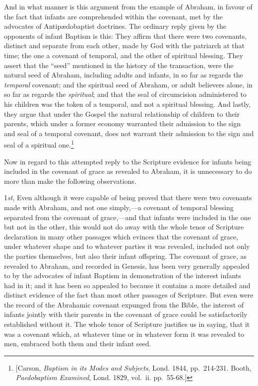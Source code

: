 \documentclass[english,]{book}
\begin{document}
And in what manner is this argument from the example of Abraham, in favour of the fact that infants are comprehended within the covenant, met by the advocates of Antipædobaptist doctrines. The ordinary reply given by the opponents of infant Baptism is this: They affirm that there were two covenants, distinct and separate from each other, made by God with the patriarch at that time; the one a covenant of temporal, and the other of spiritual blessing. They assert that the ``seed'' mentioned in the history of the transaction, were the natural seed of Abraham, including adults and infants, in so far as regards the \emph{temporal} covenant; and the spiritual seed of Abraham, or adult believers alone, in so far as regards the \emph{spiritual}; and that the seal of circumcision administered to his children was the token of a temporal, and not a spiritual blessing. And lastly, they argue that under the Gospel the natural relationship of children to their parents, which under a former economy warranted their admission to the sign and seal of a temporal covenant, does not warrant their admission to the sign and seal of a spiritual one.\footnote{{[}Carson, \emph{Baptism in its Modes and Subjects}, Lond. 1844, pp.~214-231. Booth, \emph{Paedobaptism Examined}, Lond. 1829, vol.~ii. pp.~55-68.{]}}

Now in regard to this attempted reply to the Scripture evidence for infants being included in the covenant of grace as revealed to Abraham, it is unnecessary to do more than make the following observations.

1\emph{st}, Even although it were capable of being proved that there were two covenants made with Abraham, and not one simply,---a covenant of temporal blessing separated from the covenant of grace,---and that infants were included in the one but not in the other, this would not do away with the whole tenor of Scripture declaration in many other passages which evinces that the covenant of grace, under whatever shape and to whatever parties it was revealed, included not only the parties themselves, but also their infant offspring. The covenant of grace, as revealed to Abraham, and recorded in Genesis, has been very generally appealed to by the advocates of infant Baptism in demonstration of the interest infants had in it; and it has been so appealed to because it contains a more detailed and distinct evidence of the fact than most other passages of Scripture. But even were the record of the Abrahamic covenant expunged from the Bible, the interest of infants jointly with their parents in the covenant of grace could be satisfactorily established without it. The whole tenor of Scripture justifies us in saying, that it was a covenant which, at whatever time or in whatever form it was revealed to men, embraced both them and their infant seed.
\end{document}

